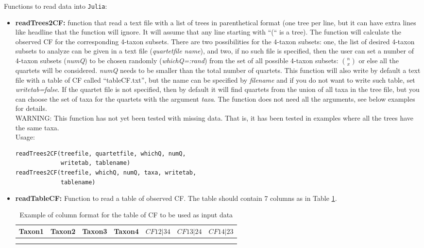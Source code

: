 \documentclass[12pt]{article}
\begin{document}
\noindent Functions to read data into \texttt{Julia}:
\begin{itemize}
\item \textbf{readTrees2CF:} function that read a text file with a
  list of trees in parenthetical format (one tree per line, but it can
  have extra lines like headline that the function will ignore. It
  will assume that any line starting with ``(`` is a tree). The
  function will calculate the observed CF for the corresponding
  4-taxon subsets. There are two possibilities for the 4-taxon subsets: one, the
  list of desired 4-taxon subsets to analyze can be given in a text file
  (\textit{quartetfile name}), and two, if no such file is specified,
  then the user can set a number of 4-taxon subsets (\textit{numQ}) to
  be chosen randomly (\textit{whichQ=:rand})
  from the set of all possible 4-taxon subsets: $n \choose x$ or else all the
  quartets will be considered. \textit{numQ} needs to be
  smaller than the total number of quartets.
  This function will also write by default a text file
  with a table of CF called ``tableCF.txt'', but the name can be
  specified by \textit{filename} and if you do not want to write such table,
  set \textit{writetab=false}. If the quartet file is not specified, then by
  default it will find quartets from the union of all taxa in the tree
  file, but you can choose the set of taxa for the quartets with the
  argument \textit{taxa}.  The function does not need all the arguments,
  see below examples for details.
  \\

  WARNING: This function has not yet been tested with missing
  data. That is, it has been tested in
  examples where all the trees have the same taxa.\\
  Usage:
\begin{lstlisting}
readTrees2CF(treefile, quartetfile, whichQ, numQ,
             writetab, tablename)
readTrees2CF(treefile, whichQ, numQ, taxa, writetab,
             tablename)
\end{lstlisting}

\item \textbf{readTableCF:} Function to read a table of observed
  CF. The table should contain 7 columns as in Table \ref{tableCF}.\\
\begin{table}[h]
\centering
\begin{tabular}{c|c|c|c|c|c|c}
Taxon1 & Taxon2 &Taxon3 & Taxon4 & $CF12|34$ & $CF13|24$ &  $CF14|23$\\
\hline \\
 & & & & & &
\end{tabular}
\caption{Example of column format for the table of CF to be used as
  input data}
\label{tableCF}
\end{table}


\end{itemize}
\end{document}
